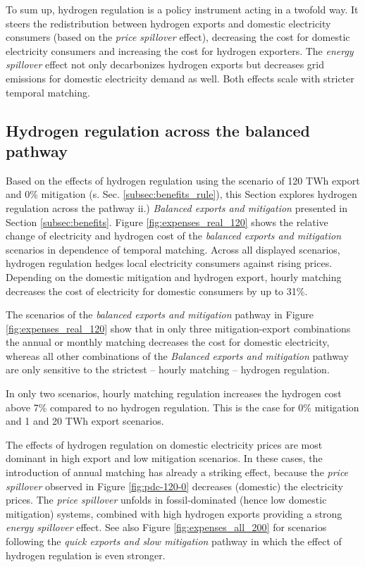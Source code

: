 To sum up, hydrogen regulation is a policy instrument acting in a twofold way. It steers the redistribution between hydrogen exports and domestic electricity consumers (based on the \textit{price spillover} effect), decreasing the cost for domestic electricity consumers and increasing the cost for hydrogen exporters. The \textit{energy spillover} effect not only decarbonizes hydrogen exports but decreases grid emissions for  domestic electricity demand as well. Both effects scale with stricter temporal matching.





\subsection{Hydrogen regulation across the balanced pathway}
\label{subsec:rule_all}

Based on the effects of hydrogen regulation using the scenario of 120 TWh export and 0\% mitigation (s. Sec. \ref{subsec:benefits_rule}), this Section explores hydrogen regulation across the pathway ii.) \textit{Balanced exports and mitigation} presented in Section \ref{subsec:benefits}. 
Figure \ref{fig:expenses_real_120} shows the relative change of electricity and hydrogen cost of the \textit{balanced exports and mitigation} scenarios in dependence of temporal matching. 
Across all displayed scenarios, hydrogen regulation hedges local electricity consumers against rising prices. Depending on the domestic mitigation and hydrogen export, hourly matching decreases the cost of electricity for domestic consumers by up to 31\%.

The scenarios of the \textit{balanced exports and mitigation} pathway in Figure \ref{fig:expenses_real_120} show that in only three mitigation-export combinations the annual or monthly matching decreases the cost for domestic electricity, whereas all other combinations of the \textit{Balanced exports and mitigation} pathway are only sensitive to the strictest -- hourly matching -- hydrogen regulation. 

In only two scenarios, hourly matching regulation increases the hydrogen cost above 7\% compared to no hydrogen regulation. This is the case for 0\% mitigation and 1 and 20 TWh export scenarios.

The effects of hydrogen regulation on domestic electricity prices are most dominant in high export and low mitigation scenarios. 
In these cases, the introduction of annual matching has already a striking effect, because the \textit{price spillover} observed in Figure \ref{fig:pdc-120-0} decreases (domestic) the electricity prices. The \textit{price spillover} unfolds in fossil-dominated (hence low domestic mitigation) systems, combined with high hydrogen exports providing a strong \textit{energy spillover} effect.
See also Figure \ref{fig:expenses_all_200} for  scenarios following the \textit{quick exports and slow mitigation} pathway in which the effect of hydrogen regulation is even stronger.

